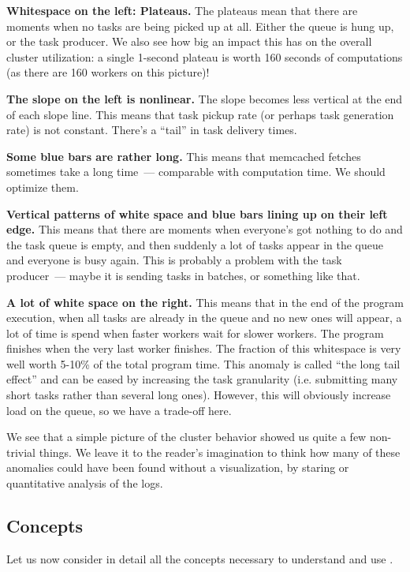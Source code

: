 \documentclass{article}
\begin{document}
\textbf{Whitespace on the left: Plateaus.} The plateaus mean that there are moments when no tasks are being picked up at all. Either the queue is hung up, or the task producer. We also see how big an impact this has on the overall cluster utilization: a single 1-second plateau is worth 160 seconds of computations (as there are 160 workers on this picture)!

\textbf{The slope on the left is nonlinear.} The slope becomes less vertical at the end of each slope line. This means that task pickup rate (or perhaps task generation rate) is not constant. There's a ``tail'' in task delivery times. 

\textbf{Some blue bars are rather long.} This means that memcached fetches sometimes take a long time~--- comparable with computation time. We should optimize them.

\textbf{Vertical patterns of white space and blue bars lining up on their left edge.} This means that there are moments when everyone's got nothing to do and the task queue is empty, and then suddenly a lot of tasks appear in the queue and everyone is busy again. This is probably a problem with the task producer~--- maybe it is sending tasks in batches, or something like that.

\textbf{A lot of white space on the right.} This means that in the end of the program execution, when all tasks are already in the queue and no new ones will appear, a lot of time is spend when faster workers wait for slower workers. The program finishes when the very last worker finishes. The fraction of this whitespace is very well worth 5-10\% of the total program time. This anomaly is called ``the long tail effect'' and can be eased by increasing the task granularity (i.e. submitting many short tasks rather than several long ones). However, this will obviously increase load on the queue, so we have a trade-off here.

\vspace{3mm}

We see that a simple picture of the cluster behavior showed us quite a few non-trivial things. We leave it to the reader's imagination to think how many of these anomalies could have been found without a visualization, by staring or quantitative analysis of the logs.

\subsection{Concepts}

Let us now consider in detail all the concepts necessary to understand and use \splot{}.
\end{document}
